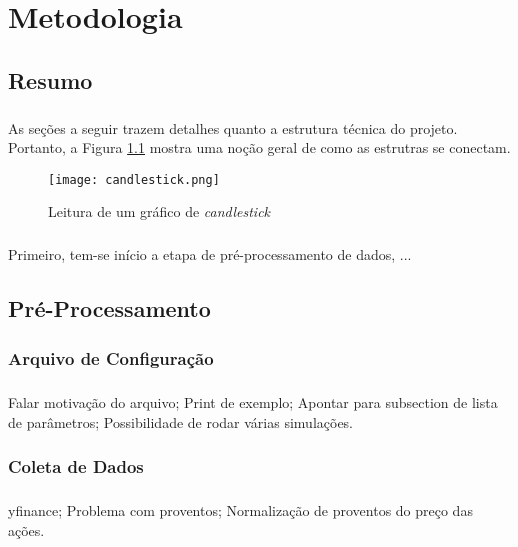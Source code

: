 \chapter{Metodologia}
\label{cap3}

\section{Resumo}

\paragraph{} As seções a seguir trazem detalhes quanto a estrutura técnica do projeto. Portanto, a Figura \ref{fig:100} mostra uma noção geral de como as estrutras se conectam.

\begin{figure}[h]
    \texttt{[image: candlestick.png]}
    \centering
    \caption{Leitura de um gráfico de \textit{candlestick} \cite{candlestick}}
    \label{fig:100}
\end{figure}

\paragraph{} Primeiro, tem-se início a etapa de pré-processamento de dados,  ...

\section{Pré-Processamento}

\subsection{Arquivo de Configuração}
\paragraph{} Falar motivação do arquivo; Print de exemplo; Apontar para subsection de lista de parâmetros; Possibilidade de rodar várias simulações.

\subsection{Coleta de Dados}
\paragraph{} yfinance; Problema com proventos; Normalização de proventos do preço das ações.

